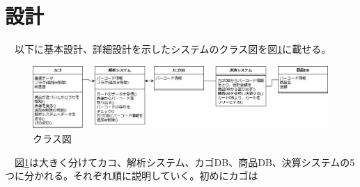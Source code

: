 \section{設計}
　以下に基本設計、詳細設計を示したシステムのクラス図\cite{v_model}を図\ref{class}に載せる。
\begin{figure}[htbp]
\centering
\includegraphics[width=15cm]{./pic/class_final.eps}
\caption{クラス図}
\label{class}
\end{figure}

　図\ref{class}は大きく分けてカコ、解析システム、カゴDB、商品DB、決算システムの5つに分かれる。それぞれ順に説明していく。初めにカゴは

